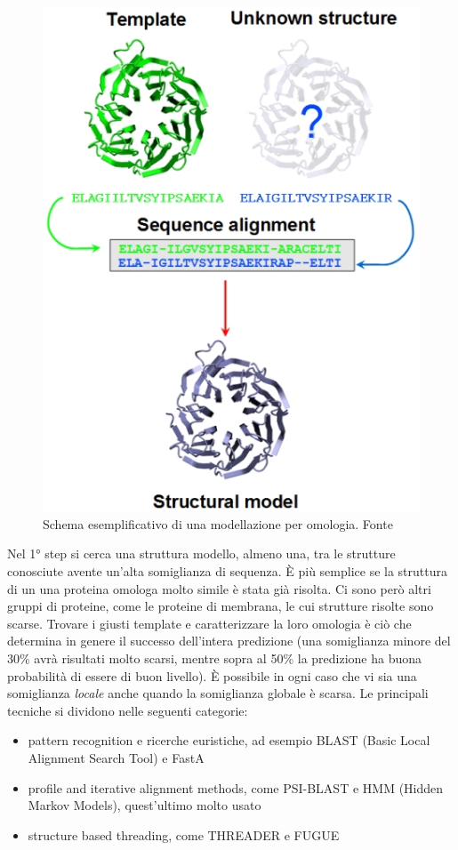 {\begin{figure}[!htb]
	\includegraphics[scale=0.5]{images/homology2.jpg}
	\caption{Schema esemplificativo di una modellazione per omologia. Fonte \cite{UNIL-homology}}
	\label{fig:omologia-esempio}
	\endminipage\hfill
\end{figure}

Nel 1° step si cerca una struttura modello, almeno una, tra le strutture conosciute avente un'alta somiglianza di sequenza. È più semplice se la struttura di un una proteina omologa molto simile è stata già risolta. Ci sono però altri gruppi di proteine, come le proteine di membrana, le cui strutture risolte sono scarse. Trovare i giusti template e caratterizzare la loro omologia è ciò che determina in genere il successo dell'intera predizione (una somiglianza minore del 30\% avrà risultati molto scarsi, mentre sopra al 50\% la predizione ha buona probabilità di essere di buon livello). È possibile in ogni caso che vi sia una somiglianza \textit{locale} anche quando la somiglianza globale è scarsa. Le principali tecniche si dividono nelle seguenti categorie:
\begin{itemize}
	\item pattern recognition e ricerche euristiche, ad esempio BLAST (Basic Local Alignment Search Tool) e FastA
	\item profile and iterative alignment methods, come PSI-BLAST e HMM (Hidden Markov Models), quest'ultimo molto usato
	\item structure based threading, come THREADER e FUGUE
\end{itemize}

}
